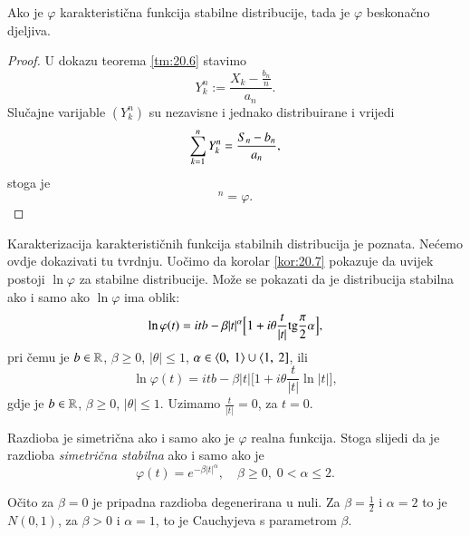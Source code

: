 \begin{kor} \label{kor:20.7}
    Ako je $\varphi$ karakteristi\v cna funkcija stabilne distribucije, tada je $\varphi$ beskona\v cno djeljiva.
\end{kor}

\begin{proof}
    U dokazu teorema \ref{tm:20.6} stavimo
    \begin{equation*}
        Y_k^n := \frac{X_k - \frac{b_n}{n}}{a_n}.
    \end{equation*}
    Slu\v cajne varijable $(Y_k^n)$ su nezavisne i jednako distribuirane i vrijedi
    \begin{equation*}
        \sum\limits_{k = 1}^{n} Y_k^n = \frac{S_n - b_n}{a_n},
    \end{equation*}
    stoga je
    \begin{equation*}
        [ \varphi_{Y_1^n} ]^n = \varphi.
    \end{equation*}
\end{proof}

\begin{nap} \label{nap:20.8}
    Karakterizacija karakteristi\v cnih funkcija stabilnih distribucija je poznata.
    Ne\' cemo ovdje dokazivati tu tvrdnju.
    Uo\v cimo da korolar \ref{kor:20.7} pokazuje da uvijek postoji $\ln \varphi$ za stabilne distribucije.
    Mo\v ze se pokazati da je distribucija stabilna ako i samo ako $\ln \varphi$ ima oblik:
    \begin{equation}    \label{jed:20.9}
        \ln \varphi (t) = itb - \beta |t|^\alpha \Big[ 1 + i \theta \frac{t}{|t|} \mathrm{tg} \frac{\pi}{2} \alpha \Big],
    \end{equation}
    pri \v cemu je $b \in \mathbb{R}$, $\beta \geq 0$, $|\theta| \leq 1$, $\alpha \in \langle {0}, \: {1} \rangle \cup \langle {1}, \: {2}]$, ili
    \begin{equation}    \label{jed:20.10}
        \ln \varphi (t) = i t b - \beta |t| \Big[ 1 + i \theta \frac{t}{|t|} \ln |t| \Big],
    \end{equation}
    gdje je $b \in \mathbb{R}$, $\beta \geq 0$, $|\theta| \leq 1$.
    Uzimamo $\frac{t}{|t|} = 0$, za $t = 0$.

    Razdioba je simetri\v cna ako i samo ako je $\varphi$ realna funkcija.
    Stoga slijedi da je razdioba \emph{simetri\v cna stabilna} ako i samo ako je
    \begin{equation}    \label{jed:20.11}
        \varphi (t) = e^{-\beta |t|^\alpha}, \quad \beta \geq 0, \; 0 < \alpha \leq 2.
    \end{equation}

    O\v cito za $\beta = 0$ je pripadna razdioba degenerirana u nuli.
    Za $\beta = \frac{1}{2}$ i $\alpha = 2$ to je $N(0,1)$, za $\beta > 0$ i $\alpha = 1$, to je Cauchyjeva s parametrom $\beta$.
\end{nap}

